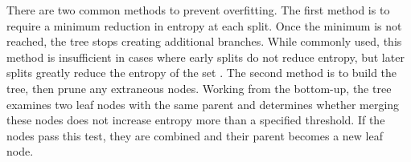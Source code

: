 There are two common methods to prevent overfitting. The first method is to require a minimum reduction in entropy at each split. Once the minimum is not reached, the tree stops creating additional branches. While commonly used, this method is insufficient in cases where early splits do not reduce entropy, but later splits greatly reduce the entropy of the set \cite{sega07}. The second method is to build the tree, then prune any extraneous nodes. Working from the bottom-up, the tree examines two leaf nodes with the same parent and determines whether merging these nodes does not increase entropy more than a specified threshold. If the nodes pass this test, they are combined and their parent becomes a new leaf node.\\

